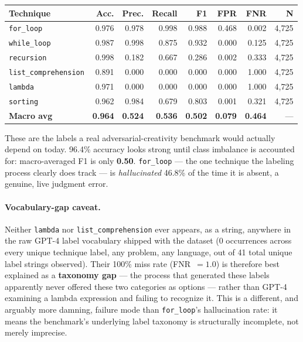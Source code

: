 \documentclass{article}
\begin{document}
\begin{center}
\begin{tabular}{lrrrrrrr}
\toprule
\textbf{Technique} & \textbf{Acc.} & \textbf{Prec.} & \textbf{Recall} & \textbf{F1} & \textbf{FPR} & \textbf{FNR} & \textbf{N} \\
\midrule
\texttt{for\_loop}           & 0.976 & 0.978 & 0.998 & 0.988 & 0.468 & 0.002 & 4{,}725 \\
\texttt{while\_loop}         & 0.987 & 0.998 & 0.875 & 0.932 & 0.000 & 0.125 & 4{,}725 \\
\texttt{recursion}           & 0.998 & 0.182 & 0.667 & 0.286 & 0.002 & 0.333 & 4{,}725 \\
\texttt{list\_comprehension} & 0.891 & 0.000 & 0.000 & 0.000 & 0.000 & 1.000 & 4{,}725 \\
\texttt{lambda}              & 0.971 & 0.000 & 0.000 & 0.000 & 0.000 & 1.000 & 4{,}725 \\
\texttt{sorting}             & 0.962 & 0.984 & 0.679 & 0.803 & 0.001 & 0.321 & 4{,}725 \\
\midrule
\textbf{Macro avg} & \textbf{0.964} & \textbf{0.524} & \textbf{0.536} & \textbf{0.502} & \textbf{0.079} & \textbf{0.464} & --- \\
\bottomrule
\end{tabular}
\end{center}

These are the labels a real adversarial-creativity benchmark would actually
depend on today. 96.4\% accuracy looks strong until class imbalance is
accounted for: macro-averaged F1 is only \textbf{0.50}. \texttt{for\_loop} ---
the one technique the labeling process clearly does track --- is
\emph{hallucinated} 46.8\% of the time it is absent, a genuine, live judgment
error.

\paragraph{Vocabulary-gap caveat.} Neither \texttt{lambda} nor
\texttt{list\_comprehension} ever appears, as a string, anywhere in the raw
GPT-4 label vocabulary shipped with the dataset (0 occurrences across every
unique technique label, any problem, any language, out of 41 total unique
label strings observed). Their 100\% miss rate (FNR~$=1.0$) is therefore best
explained as a \textbf{taxonomy gap} --- the process that generated these
labels apparently never offered these two categories as options --- rather
than GPT-4 examining a lambda expression and failing to recognize it. This is
a different, and arguably more damning, failure mode than \texttt{for\_loop}'s
hallucination rate: it means the benchmark's underlying label taxonomy is
structurally incomplete, not merely imprecise.
\end{document}
